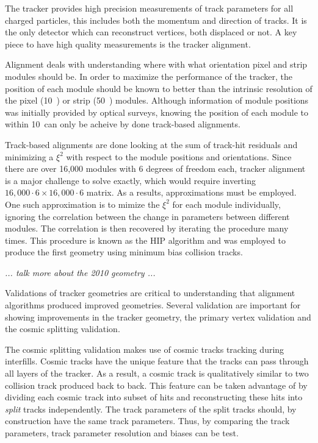 The tracker provides high precision measurements of track parameters for
all charged particles, this includes both the momentum and direction
of tracks.  It is the only detector which can reconstruct vertices, both
displaced or not.  A key piece to have high quality measurements is the 
tracker alignment.  

Alignment deals with understanding where with what 
orientation pixel and strip modules should be.  In order to maximize the 
performance of the tracker, the position of each module should be known to
better than the intrinsic resolution of the pixel (10~\microns) or strip 
(50~\microns) modules.  Although information of
module positions was initially provided by optical surveys, knowing the 
position of each module to within 10~\microns can only be acheive by done
track-based alignments.  

Track-based alignments are done looking at the sum of track-hit residuals
and minimizing a $\xi^2$ with respect to the module positions and 
orientations.  Since there are over 
16,000 modules with 6 degrees of freedom each, tracker alignment is a 
major challenge to solve exactly, which would require inverting
$16,000\cdot6\times16,000\cdot6$ matrix.  As a results, approximations 
must be employed.   One such approximation is to mimize the $\xi^2$ for
each module individually, ignoring the correlation between the change in 
parameters between different modules.  The correlation is then recovered 
by iterating the procedure many times.  This procedure is known as the 
HIP algorithm and was employed to produce the first geometry using minimum
bias collision tracks.  

{\it ... talk more about the 2010 geometry ...}

Validations of tracker geometries are critical to understanding that 
alignment algorithms produced improved geometries.  Several validation
are important for showing improvements in the tracker geometry, the 
primary vertex validation and the cosmic splitting validation. 

The cosmic splitting validation makes use of cosmic tracks tracking 
during interfills.  Cosmic tracks have the unique feature that the 
tracks can pass through all layers of the tracker.  As a result,
a cosmic track is qualitatively similar to two collision track
produced back to back.  This feature can be taken advantage of by dividing
each cosmic track into subset of hits and reconstructing these hits 
into {\it split} tracks independently.  The track parameters of the 
split tracks should, by construction have the same track parameters.  
Thus, by comparing the track parameters, track parameter resolution
and biases can be test.  

